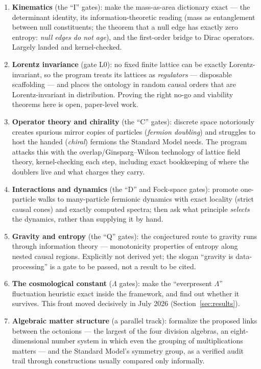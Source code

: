 \documentclass[11pt]{article}
\newcommand{\Lam}{\Lambda}
\begin{document}
\begin{enumerate}
\item \textbf{Kinematics} (the ``I'' gates): make the mass-as-area
  dictionary exact --- the determinant identity, its information-theoretic
  reading (mass as entanglement between null constituents; the theorem
  that a null edge has exactly zero entropy: \emph{null edges do not
  age}), and the first-order bridge to Dirac operators.  Largely landed
  and kernel-checked.
\item \textbf{Lorentz invariance} (gate L0): no fixed finite lattice can
  be exactly Lorentz-invariant, so the program treats its lattices as
  \emph{regulators} --- disposable scaffolding --- and places the ontology
  in random causal orders that are Lorentz-invariant in distribution.
  Proving the right no-go and viability theorems here is open, paper-level
  work.
\item \textbf{Operator theory and chirality} (the ``C'' gates): discrete
  space notoriously creates spurious mirror copies of particles
  (\emph{fermion doubling}) and struggles to host the handed
  (\emph{chiral}) fermions the Standard Model needs.  The program attacks
  this with the overlap/Ginsparg--Wilson technology of lattice field
  theory, kernel-checking each step, including exact bookkeeping of where
  the doublers live and what charges they carry.
\item \textbf{Interactions and dynamics} (the ``D'' and Fock-space gates):
  promote one-particle walks to many-particle fermionic dynamics with
  exact locality (strict causal cones) and exactly computed spectra; then
  ask what principle \emph{selects} the dynamics, rather than supplying it
  by hand.
\item \textbf{Gravity and entropy} (the ``Q'' gates): the conjectured
  route to gravity runs through information theory --- monotonicity
  properties of entropy along nested causal regions.  Explicitly not
  derived yet; the slogan ``gravity is data-processing'' is a gate to be
  passed, not a result to be cited.
\item \textbf{The cosmological constant} ($\Lam$ gates): make the
  ``everpresent $\Lam$'' fluctuation heuristic exact inside the framework,
  and find out whether it survives.  This front moved decisively in July
  2026 (Section~\ref{sec:results}).
\item \textbf{Algebraic matter structure} (a parallel track): formalize
  the proposed links between the octonions --- the largest of the four
  division algebras, an eight-dimensional number system in which even the
  grouping of multiplications matters --- and the Standard Model's
  symmetry group, as a verified audit trail through constructions usually
  compared only informally.
\end{enumerate}
\end{document}
